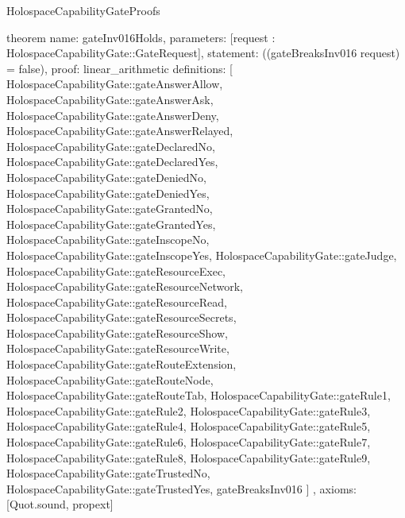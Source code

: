 \begin{lexlean}{HolospaceCapabilityGateProofs}
\begin{semanticmodule}
theorem{
  name: gateInv016Holds,
  parameters: [request : HolospaceCapabilityGate::GateRequest],
  statement: ((gateBreaksInv016 request) = false),
  proof: linear_arithmetic{
    definitions: [
      HolospaceCapabilityGate::gateAnswerAllow,
      HolospaceCapabilityGate::gateAnswerAsk,
      HolospaceCapabilityGate::gateAnswerDeny,
      HolospaceCapabilityGate::gateAnswerRelayed,
      HolospaceCapabilityGate::gateDeclaredNo,
      HolospaceCapabilityGate::gateDeclaredYes,
      HolospaceCapabilityGate::gateDeniedNo,
      HolospaceCapabilityGate::gateDeniedYes,
      HolospaceCapabilityGate::gateGrantedNo,
      HolospaceCapabilityGate::gateGrantedYes,
      HolospaceCapabilityGate::gateInscopeNo,
      HolospaceCapabilityGate::gateInscopeYes,
      HolospaceCapabilityGate::gateJudge,
      HolospaceCapabilityGate::gateResourceExec,
      HolospaceCapabilityGate::gateResourceNetwork,
      HolospaceCapabilityGate::gateResourceRead,
      HolospaceCapabilityGate::gateResourceSecrets,
      HolospaceCapabilityGate::gateResourceShow,
      HolospaceCapabilityGate::gateResourceWrite,
      HolospaceCapabilityGate::gateRouteExtension,
      HolospaceCapabilityGate::gateRouteNode,
      HolospaceCapabilityGate::gateRouteTab,
      HolospaceCapabilityGate::gateRule1,
      HolospaceCapabilityGate::gateRule2,
      HolospaceCapabilityGate::gateRule3,
      HolospaceCapabilityGate::gateRule4,
      HolospaceCapabilityGate::gateRule5,
      HolospaceCapabilityGate::gateRule6,
      HolospaceCapabilityGate::gateRule7,
      HolospaceCapabilityGate::gateRule8,
      HolospaceCapabilityGate::gateRule9,
      HolospaceCapabilityGate::gateTrustedNo,
      HolospaceCapabilityGate::gateTrustedYes,
      gateBreaksInv016
    ]
  },
  axioms: [Quot.sound, propext]
}
\end{semanticmodule}
\end{lexlean}
